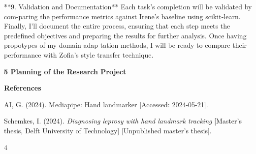 \documentclass[
]{article}
\begin{document}
**9. Validation and Documentation** Each task's completion will be
validated by com-paring the performance metrics against Irene's baseline
using scikit-learn. Finally, I'll document the entire process, ensuring
that each step meets the predefined objectives and preparing the results
for further analysis. Once having propotypes of my domain adap-tation
methods, I will be ready to compare their performance with Zofia's style
transfer technique.

\textbf{5 Planning of the Research Project}

\textbf{References}

AI, G. (2024). Mediapipe: Hand landmarker {[}Accessed: 2024-05-21{]}.

Schemkes, I. (2024). \emph{Diagnosing leprosy with hand landmark
tracking} {[}Master's thesis, Delft University of Technology{]}
{[}Unpublished master's thesis{]}.

4
\end{document}
